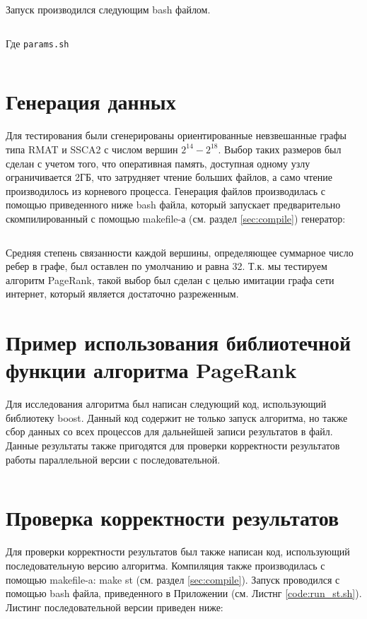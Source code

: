 \documentclass[12pt, a4paper]{article}
\begin{document}
            Запуск производился следующим bash файлом.
            \inputminted[breaklines=true,fontsize=\scriptsize,frame=single]{bash}{run.sh}

            Где \verb|params.sh|
            \inputminted[breaklines=true,fontsize=\scriptsize,frame=single]{bash}{params.sh}

    \section{Генерация данных}
        Для тестирования были сгенерированы ориентированные невзвешанные графы типа RMAT и SSCA2 с числом вершин $2^{14} - 2^{18}$. Выбор таких размеров был сделан с учетом того, что оперативная память, доступная одному узлу ограничивается 2ГБ, что затрудняет чтение больших файлов, а само чтение производилось из корневого процесса. Генерация файлов производилась с помощью приведенного ниже bash файла, который запускает предварительно скомпилированный с помощью makefile-а (см. раздел \ref{sec:compile}) генератор:
        \inputminted[breaklines=true,fontsize=\scriptsize,frame=single]{bash}{generate.sh}

        Средняя степень связанности каждой вершины, определяющее суммарное число ребер в графе, был оставлен по умолчанию и равна 32. Т.к. мы тестируем алгоритм PageRank, такой выбор был сделан с целью имитации графа сети интернет, который является достаточно разреженным.

    \section{Пример использования библиотечной функции алгоритма PageRank}
        Для исследования алгоритма был написан следующий код, использующий библиотеку boost. Данный код содержит не только запуск алгоритма, но также сбор данных со всех процессов для дальнейшей записи результатов в файл. Данные результаты также пригодятся для проверки корректности результатов работы параллельной версии с последовательной.
        \inputminted[breaklines=true,fontsize=\scriptsize,frame=single]{cpp}{code.cpp}

    \section{Проверка корректности результатов}
        Для проверки корректности результатов был также написан код, использующий последовательную версию алгоритма. Компиляция также производилась с помощью makefile-a: make st (см. раздел \ref{sec:compile}). Запуск проводился с помощью bash файла, приведенного в Приложении (см. Листнг \ref{code:run_st.sh}). Листинг последовательной версии приведен ниже:
        \inputminted[breaklines=true,fontsize=\scriptsize,frame=single]{cpp}{code_st.cpp}
\end{document}
